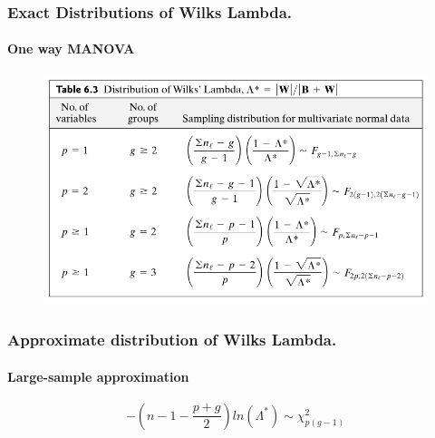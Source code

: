 \documentclass[aspectratio=169,10pt,t]{beamer}
\begin{document}
\begin{frame}[t]
    \frametitle{Exact Distributions of Wilks Lambda.}
    \framesubtitle{One way MANOVA}
    \begin{figure}[H]
    \centering
    \includegraphics[scale=0.3]{images/1.png}
    \end{figure}
\end{frame}

\begin{frame}[t]
    \frametitle{Approximate distribution of Wilks Lambda.}
    \framesubtitle{Large-sample approximation }
    \[
        -\left(n-1-\frac{p+g}{2}\right)ln\left( \Lambda^*\right) \sim \chi^2_{p(g-1)}
    \]  
\end{frame}
\end{document}
